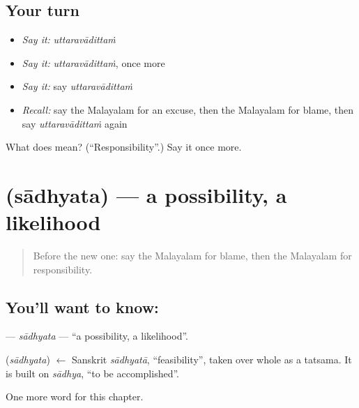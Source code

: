 \subsection*{Your turn}
\begin{itemize}
\raggedright
  \item \emph{Say it:} \emph{uttaravādittaṁ}
  \item \emph{Say it:} \emph{uttaravādittaṁ}, once more
  \item \emph{Say it:} say \emph{uttaravādittaṁ}
  \item \emph{Recall:} say the Malayalam for an excuse, then the Malayalam for blame, then say \emph{uttaravādittaṁ} again
\end{itemize}

\begin{tcolorbox}[breakable,colback=teal!4,colframe=teal!35!black,title={Before you move on}]
What does  mean? (\textquotedblleft{}Responsibility\textquotedblright{}.) Say it once more.
\end{tcolorbox}
\section[\texorpdfstring{\ml{സാധ്യത} (sādhyata)}{സാധ്യത (sādhyata)}]{ (sādhyata) — a possibility, a likelihood}

\label{lesson:ML-C243-sadhyata}



\begin{quote}
Before the new one: say the Malayalam for blame, then the Malayalam for responsibility.
\end{quote}

\subsection*{You'll want to know: }
\textbf{} — \emph{sādhyata} — \textquotedblleft{}a possibility, a likelihood\textquotedblright{}.

\begin{cousinweb}
\textbf{} (\emph{sādhyata}) $\leftarrow$ Sanskrit \emph{sādhyatā}, \textquotedblleft{}feasibility\textquotedblright{}, taken over whole as a tatsama. It is built on \emph{sādhya}, \textquotedblleft{}to be accomplished\textquotedblright{}.
\end{cousinweb}

\begin{grammarlens}[title={What you've built}]
One more word for this chapter.
\end{grammarlens}

